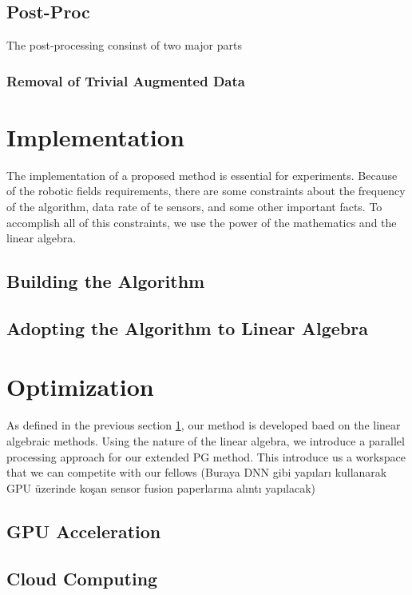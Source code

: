 \documentclass[conference]{IEEEtran}
\begin{document}
\subsection{Post-Proc}

The post-processing consinst of two major parts 

\subsubsection{Removal of Trivial Augmented Data}

\section{Implementation} \label{implementation}

The implementation of a proposed method is essential for experiments. Because of the robotic fields requirements, there are some constraints about the frequency of the algorithm, data rate of te sensors, and some other important facts. To accomplish all of this constraints, we use the power of the mathematics and the linear algebra. 

\subsection{Building the Algorithm}

\subsection{Adopting the Algorithm to Linear Algebra}

\section{Optimization}

As defined in the previous section \ref{implementation}, our method is developed baed on the linear algebraic methods. Using the nature of the linear algebra, we introduce a parallel processing approach for our extended PG method. This introduce us a workspace that we can competite with our fellows (Buraya DNN gibi yapıları kullanarak GPU üzerinde koşan sensor fusion paperlarına alıntı yapılacak)

\subsection{GPU Acceleration}
\subsection{Cloud Computing}
\end{document}

